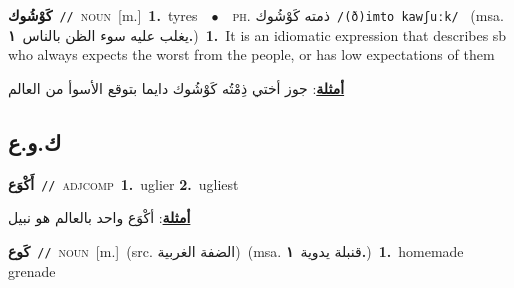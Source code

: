 \documentclass[10pt,a4paper,twoside]{article} %
\begin{document}
\begin{multicols}{2}
{\setlength\topsep{0pt}\textbf{\foreignlanguage{arabic}{كَوْشُوك}}\ {\color{gray}\texttt{//}\color{black}}\ \textsc{noun}\ [m.]\ \textbf{1.}~tyres\ \ $\bullet$\ \ \textsc{ph.} \color{gray} \foreignlanguage{arabic}{ذمته كَوْشُوك}\color{black}\ {\color{gray}\texttt{/{\sffamily (ð)imto kawʃuːk}/}\color{black}}\ \color{gray} (msa. \foreignlanguage{arabic}{يغلب عليه سوء الظن بالناس}~\foreignlanguage{arabic}{\textbf{١.}})\color{black}\ \textbf{1.}~It is an idiomatic expression that describes sb who always expects the worst from the people, or has low expectations of them\  \begin{flushright}\color{gray}\foreignlanguage{arabic}{\textbf{\underline{\foreignlanguage{arabic}{أمثلة}}}: جوز أختي ذِمْتُه كَوْشُوك دايما بتوقع الأسوأ من العالم}\end{flushright}\color{black}} \vspace{2mm}

\vspace{-3mm}
\subsection*{\color{blue}\foreignlanguage{arabic}{ك.و.ع}\color{blue}{}} 

{\setlength\topsep{0pt}\textbf{\foreignlanguage{arabic}{أَكْوَع}}\ {\color{gray}\texttt{//}\color{black}}\ \textsc{adj\textunderscore comp}\ \textbf{1.}~uglier  \textbf{2.}~ugliest\  \begin{flushright}\color{gray}\foreignlanguage{arabic}{\textbf{\underline{\foreignlanguage{arabic}{أمثلة}}}: أكْوَع واحد بالعالم هو نبيل}\end{flushright}\color{black}} \vspace{2mm}

{\setlength\topsep{0pt}\textbf{\foreignlanguage{arabic}{كَوع}}\ {\color{gray}\texttt{//}\color{black}}\ \textsc{noun}\ [m.]\ (src. \color{gray}\foreignlanguage{arabic}{الضفة الغربية}\color{black})\ \color{gray}(msa. \foreignlanguage{arabic}{قنبلة يدوية}~\foreignlanguage{arabic}{\textbf{١.}})\color{black}\ \textbf{1.}~homemade grenade\ } \vspace{2mm}


\end{multicols}
\end{document}
